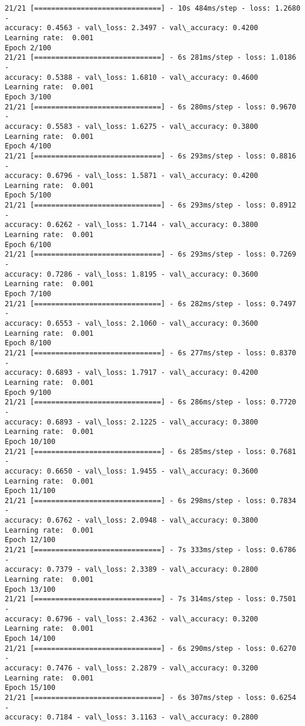 \documentclass[11pt]{article}
\begin{document}
    \begin{Verbatim}[commandchars=\\\{\}]
21/21 [==============================] - 10s 484ms/step - loss: 1.2680 -
accuracy: 0.4563 - val\_loss: 2.3497 - val\_accuracy: 0.4200
Learning rate:  0.001
Epoch 2/100
21/21 [==============================] - 6s 281ms/step - loss: 1.0186 -
accuracy: 0.5388 - val\_loss: 1.6810 - val\_accuracy: 0.4600
Learning rate:  0.001
Epoch 3/100
21/21 [==============================] - 6s 280ms/step - loss: 0.9670 -
accuracy: 0.5583 - val\_loss: 1.6275 - val\_accuracy: 0.3800
Learning rate:  0.001
Epoch 4/100
21/21 [==============================] - 6s 293ms/step - loss: 0.8816 -
accuracy: 0.6796 - val\_loss: 1.5871 - val\_accuracy: 0.4200
Learning rate:  0.001
Epoch 5/100
21/21 [==============================] - 6s 293ms/step - loss: 0.8912 -
accuracy: 0.6262 - val\_loss: 1.7144 - val\_accuracy: 0.3800
Learning rate:  0.001
Epoch 6/100
21/21 [==============================] - 6s 293ms/step - loss: 0.7269 -
accuracy: 0.7286 - val\_loss: 1.8195 - val\_accuracy: 0.3600
Learning rate:  0.001
Epoch 7/100
21/21 [==============================] - 6s 282ms/step - loss: 0.7497 -
accuracy: 0.6553 - val\_loss: 2.1060 - val\_accuracy: 0.3600
Learning rate:  0.001
Epoch 8/100
21/21 [==============================] - 6s 277ms/step - loss: 0.8370 -
accuracy: 0.6893 - val\_loss: 1.7917 - val\_accuracy: 0.4200
Learning rate:  0.001
Epoch 9/100
21/21 [==============================] - 6s 286ms/step - loss: 0.7720 -
accuracy: 0.6893 - val\_loss: 2.1225 - val\_accuracy: 0.3800
Learning rate:  0.001
Epoch 10/100
21/21 [==============================] - 6s 285ms/step - loss: 0.7681 -
accuracy: 0.6650 - val\_loss: 1.9455 - val\_accuracy: 0.3600
Learning rate:  0.001
Epoch 11/100
21/21 [==============================] - 6s 298ms/step - loss: 0.7834 -
accuracy: 0.6762 - val\_loss: 2.0948 - val\_accuracy: 0.3800
Learning rate:  0.001
Epoch 12/100
21/21 [==============================] - 7s 333ms/step - loss: 0.6786 -
accuracy: 0.7379 - val\_loss: 2.3389 - val\_accuracy: 0.2800
Learning rate:  0.001
Epoch 13/100
21/21 [==============================] - 7s 314ms/step - loss: 0.7501 -
accuracy: 0.6796 - val\_loss: 2.4362 - val\_accuracy: 0.3200
Learning rate:  0.001
Epoch 14/100
21/21 [==============================] - 6s 290ms/step - loss: 0.6270 -
accuracy: 0.7476 - val\_loss: 2.2879 - val\_accuracy: 0.3200
Learning rate:  0.001
Epoch 15/100
21/21 [==============================] - 6s 307ms/step - loss: 0.6254 -
accuracy: 0.7184 - val\_loss: 3.1163 - val\_accuracy: 0.2800

\end{Verbatim}
\end{document}
